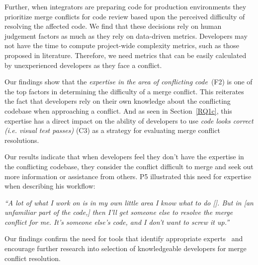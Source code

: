 Further, when integrators are preparing code for production environments they prioritize merge conflicts for code review based upon the perceived difficulty of resolving the affected code.
We find that these decisions rely on human judgement factors as much as they rely on data-driven metrics.
Developers may not have the time to compute project-wide complexity metrics, such as those proposed in literature.
Therefore, we need metrics that can be easily calculated by unexperienced developers as they face a conflict. 

\label{knowledge-based-factors}
Our findings show that the \textit{expertise in the area of conflicting code}~(F2) is one of the top factors in determining the difficulty of a merge conflict. 
This reiterates the fact that developers rely on their own knowledge about the conflicting codebase when approaching a conflict. 
And as seen in Section~\ref{RQ1c}, this expertise has a direct impact on the ability of developers to use \textit{code looks correct (i.e. visual test passes)} (C3) as a strategy for evaluating merge conflict resolutions.

Our results indicate that when developers feel they don't have the expertise in the conflicting codebase, they consider the conflict difficult to merge and seek out more information or assistance from others.
P5 illustrated this need for expertise when describing his workflow: 
\begin{quoting}
	\textit{``A lot of what I work on is in my own little area \textellipsis I know what to do [\textellipsis]. But in [an unfamiliar part of the code,] then I'll get someone else to resolve the merge conflict for me. It's someone else's code, and I don't want to screw it up.''}
\end{quoting}

Our findings confirm the need for tools that identify appropriate experts~\cite{CostaSarma} and encourage further research into selection of knowledgeable developers for merge conflict resolution.


